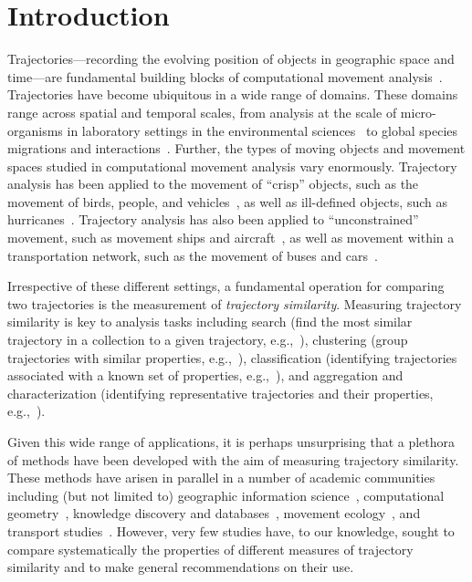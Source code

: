\documentclass[10pt,letterpaper]{article}
\begin{document}
\section{Introduction}
Trajectories---recording the evolving position of objects in geographic space and time---are fundamental building blocks of computational movement analysis~\cite{DBLP:series/sbcs/Laube14}. Trajectories have become ubiquitous in a wide range of domains. These domains range across spatial and temporal scales, from analysis at the scale of micro-organisms in laboratory settings in the environmental sciences~\cite{nathan_movement_2008} to global species migrations and interactions~\cite{horne_analyzing_2007,andersson_reporting_2008}. Further, the types of moving objects and movement spaces studied in computational movement analysis vary enormously. Trajectory analysis has been applied to the movement of ``crisp'' objects, such as the movement of birds, people, and vehicles~\cite{fritz_scaledependent_2003,gonzalez_understanding_2008,liu_understanding_2012}, as well as ill-defined objects, such as hurricanes~\cite{dodge_movement_2012}. Trajectory analysis has also been applied to ``unconstrained'' movement, such as movement ships and aircraft~\cite{kaluza_complex_2010}, as well as movement within a transportation network, such as the movement of buses and cars~\cite{tao_analytics_2017}. 

Irrespective of these different settings, a fundamental operation for comparing two trajectories is the measurement of \emph{trajectory similarity}. Measuring trajectory similarity is key to analysis tasks including search (find the most similar trajectory in a collection to a given trajectory, e.g.,~\cite{DBLP:journals/comgeo/BuchinBKL11}), clustering (group trajectories with similar properties, e.g.,~\cite{DBLP:conf/icpr/ZhangHT06}), classification (identifying trajectories associated with a known set of properties, e.g.,~\cite{DBLP:journals/tip/BashirKS07}), and aggregation and characterization (identifying representative trajectories and their properties, e.g.,~\cite{DBLP:journals/algorithmica/BuchinBKLSWW13}). 

Given this wide range of applications, it is perhaps unsurprising that a plethora of methods have been developed with the aim of measuring trajectory similarity. These methods have  arisen in parallel  in a number of academic communities including (but not limited to) geographic information science~\cite{DBLP:journals/gis/DodgeLW12}, computational geometry~\cite{DBLP:journals/comgeo/BuchinBKL11}, knowledge discovery and databases~\cite{DBLP:conf/time/PelekisKMNAT07}, movement ecology~\cite{demvsar2015analysis}, and transport studies~\cite{DBLP:journals/tits/ZhangWWLXC11}. However, very few studies have, to our knowledge, sought to compare systematically the properties of different measures of trajectory similarity and to make general recommendations on their use. 
\end{document}

